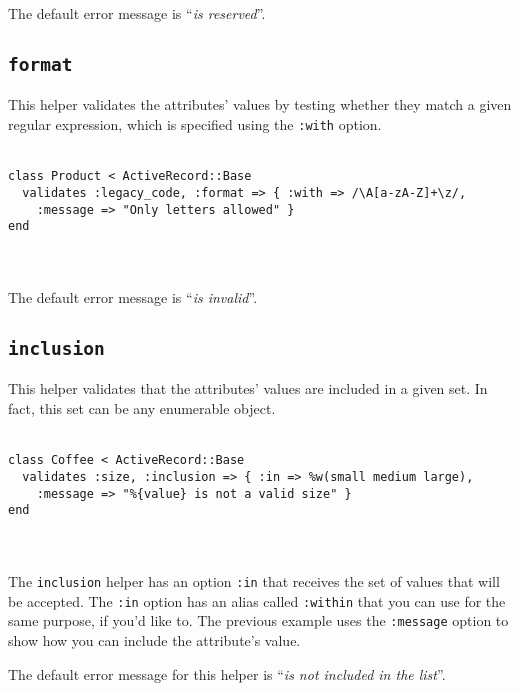 \documentclass[10pt]{book}
\begin{document}
The default error message is “\emph{is reserved}”.

\subsection{ \texttt{format}}

This helper validates the attributes’ values by testing whether they  match a given regular expression, which is specified using the \texttt{:with} option.
\\ \\
\begin{minipage}{\textwidth}{\scriptsize
\begin{verbatim}
class Product < ActiveRecord::Base
  validates :legacy_code, :format => { :with => /\A[a-zA-Z]+\z/,
    :message => "Only letters allowed" }
end
\end{verbatim}}
\end{minipage}
\\ \\
The default error message is “\emph{is invalid}”.

\subsection{ \texttt{inclusion}}

This helper validates that the attributes’ values are included in a given set. In fact, this set can be any enumerable object.
\\ \\
\begin{minipage}{\textwidth}{\scriptsize
\begin{verbatim}
class Coffee < ActiveRecord::Base
  validates :size, :inclusion => { :in => %w(small medium large),
    :message => "%{value} is not a valid size" }
end
\end{verbatim}}
\end{minipage}
\\ \\

The \texttt{inclusion} helper has an option \texttt{:in} that receives the set of values that will be accepted. The \texttt{:in} option has an alias called \texttt{:within} that you can use for the same purpose, if you’d like to. The previous example uses the \texttt{:message} option to show how you can include the attribute’s value.

The default error message for this helper is “\emph{is not included in the list}”.
\end{document}
